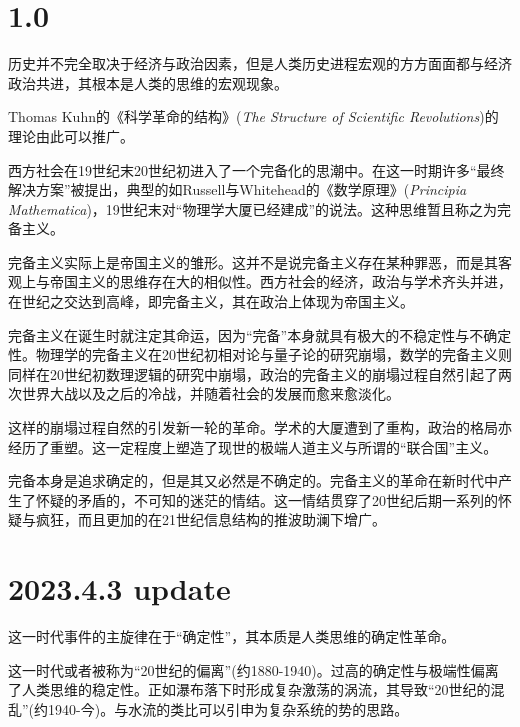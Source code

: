 \documentclass{ctexart}
\begin{document}
\section{1.0}

历史并不完全取决于经济与政治因素，但是人类历史进程宏观的方方面面都与经济政治共进，其根本是人类的思维的宏观现象。

Thomas Kuhn的《科学革命的结构》(\textit{The Structure of Scientific Revolutions})的理论由此可以推广。

西方社会在19世纪末20世纪初进入了一个完备化的思潮中。在这一时期许多“最终解决方案”被提出，典型的如Russell与Whitehead的《数学原理》(\textit{Principia Mathematica})，19世纪末对“物理学大厦已经建成”的说法。这种思维暂且称之为完备主义。

完备主义实际上是帝国主义的雏形。这并不是说完备主义存在某种罪恶，而是其客观上与帝国主义的思维存在大的相似性。西方社会的经济，政治与学术齐头并进，在世纪之交达到高峰，即完备主义，其在政治上体现为帝国主义。

完备主义在诞生时就注定其命运，因为“完备”本身就具有极大的不稳定性与不确定性。物理学的完备主义在20世纪初相对论与量子论的研究崩塌，数学的完备主义则同样在20世纪初数理逻辑的研究中崩塌，政治的完备主义的崩塌过程自然引起了两次世界大战以及之后的冷战，并随着社会的发展而愈来愈淡化。

这样的崩塌过程自然的引发新一轮的革命。学术的大厦遭到了重构，政治的格局亦经历了重塑。这一定程度上塑造了现世的极端人道主义与所谓的“联合国”主义。

完备本身是追求确定的，但是其又必然是不确定的。完备主义的革命在新时代中产生了怀疑的矛盾的，不可知的迷茫的情结。这一情结贯穿了20世纪后期一系列的怀疑与疯狂，而且更加的在21世纪信息结构的推波助澜下增广。

\section{2023.4.3 update}

这一时代事件的主旋律在于“确定性”，其本质是人类思维的确定性革命。

这一时代或者被称为“20世纪的偏离”(约1880-1940)。过高的确定性与极端性偏离了人类思维的稳定性。正如瀑布落下时形成复杂激荡的涡流，其导致“20世纪的混乱”(约1940-今)。与水流的类比可以引申为复杂系统的势的思路。
\end{document}
